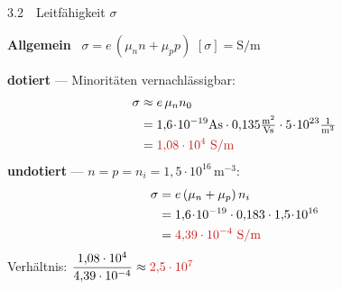 \begin{RezeptA}{3.2\ \ Leitfähigkeit $\sigma$ \hfill {}}

\textbf{Allgemein} \ $\sigma=e\,(\mu_n n+\mu_p p)$ \quad
$[\sigma]=\mathrm{S/m}$
\vspace{0.4mm}


\Beispiel[Si, $n_0=5\cdot10^{17}\,\mathrm{cm^{-3}}=5\cdot10^{23}\,\mathrm{m^{-3}}$]
\textbf{dotiert} — Minoritäten vernachlässigbar:
\begin{align*}
\sigma &\approx e\,\mu_n n_0\\
 &= 1{,}6\!\cdot\!10^{-19}\mathrm{As}\cdot0{,}135\tfrac{\mathrm{m^2}}{\mathrm{Vs}}
    \cdot5\!\cdot\!10^{23}\tfrac{1}{\mathrm{m^3}}\\
 &= \erg{1{,}08\cdot10^{4}\ \mathrm{S/m}}
\end{align*}
\textbf{undotiert} — $n=p=n_i=1{,}5\cdot10^{16}\,\mathrm{m^{-3}}$:
\begin{align*}
\sigma &= e\,(\mu_n+\mu_p)\,n_i\\
 &= 1{,}6\!\cdot\!10^{-19}\cdot0{,}183\cdot1{,}5\!\cdot\!10^{16}\\
 &= \erg{4{,}39\cdot10^{-4}\ \mathrm{S/m}}
\end{align*}
Verhältnis: $\dfrac{1{,}08\cdot10^{4}}{4{,}39\cdot10^{-4}}
 \approx\erg{2{,}5\cdot10^{7}}$
\end{RezeptA}


